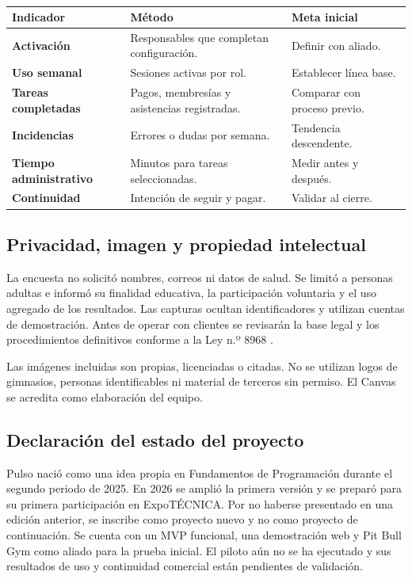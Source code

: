 \begin{table}[htbp]
\caption{Indicadores propuestos para un piloto}
\begin{tabularx}{\textwidth}{>{\bfseries}p{4cm}X p{3cm}}
\toprule
Indicador & Método & Meta inicial \\
\midrule
Activación & Responsables que completan configuración. & Definir con aliado. \\
Uso semanal & Sesiones activas por rol. & Establecer línea base. \\
Tareas completadas & Pagos, membresías y asistencias registradas. & Comparar con proceso previo. \\
Incidencias & Errores o dudas por semana. & Tendencia descendente. \\
Tiempo administrativo & Minutos para tareas seleccionadas. & Medir antes y después. \\
Continuidad & Intención de seguir y pagar. & Validar al cierre. \\
\bottomrule
\end{tabularx}
\caption*{\fuentepropia}
\end{table}

\subsection{Privacidad, imagen y propiedad intelectual}

La encuesta no solicitó nombres, correos ni datos de salud. Se limitó a personas
adultas e informó su finalidad educativa, la participación voluntaria y el uso
agregado de los resultados. Las capturas ocultan identificadores y utilizan
cuentas de demostración. Antes de operar con clientes se revisarán la base legal y
los procedimientos definitivos conforme a la Ley n.º 8968
\parencite{ley8968}.

Las imágenes incluidas son propias, licenciadas o citadas. No se utilizan logos de
gimnasios, personas identificables ni material de terceros sin permiso. El Canvas
se acredita como elaboración del equipo.

\subsection{Declaración del estado del proyecto}

Pulso nació como una idea propia en Fundamentos de Programación durante el
segundo periodo de 2025. En 2026 se amplió la primera versión y se preparó para
su primera participación en ExpoTÉCNICA. Por no haberse presentado en una
edición anterior, se inscribe como proyecto nuevo y no como proyecto de
continuación. Se cuenta con un MVP funcional, una demostración web y Pit Bull
Gym como aliado para la prueba inicial. El piloto aún no se ha ejecutado y sus
resultados de uso y continuidad comercial están pendientes de validación.
